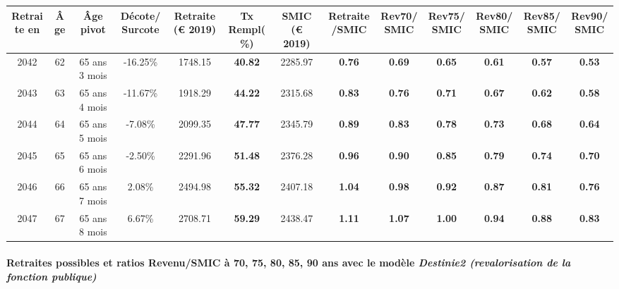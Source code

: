{ \scriptsize \begin{center} 
\begin{tabular}[htb]{|c|c||c|c||c|c||c||c|c|c|c|c|c|} 
\hline 
 Retraite en &  Âge &  Âge pivot &  Décote/Surcote &  Retraite (\euro{} 2019) &  Tx Rempl(\%) &  SMIC (\euro{} 2019) &  Retraite/SMIC &  Rev70/SMIC &  Rev75/SMIC &  Rev80/SMIC &  Rev85/SMIC &  Rev90/SMIC \\ 
\hline \hline 
 2042 &  62 &  65 ans 3 mois &  -16.25\% &  1748.15 &  {\bf 40.82} &  2285.97 &  {\bf {\color{red} 0.76}} &  {\bf {\color{red} 0.69}} &  {\bf {\color{red} 0.65}} &  {\bf {\color{red} 0.61}} &  {\bf {\color{red} 0.57}} &  {\bf {\color{red} 0.53}} \\ 
\hline 
 2043 &  63 &  65 ans 4 mois &  -11.67\% &  1918.29 &  {\bf 44.22} &  2315.68 &  {\bf {\color{red} 0.83}} &  {\bf {\color{red} 0.76}} &  {\bf {\color{red} 0.71}} &  {\bf {\color{red} 0.67}} &  {\bf {\color{red} 0.62}} &  {\bf {\color{red} 0.58}} \\ 
\hline 
 2044 &  64 &  65 ans 5 mois &  -7.08\% &  2099.35 &  {\bf 47.77} &  2345.79 &  {\bf {\color{red} 0.89}} &  {\bf {\color{red} 0.83}} &  {\bf {\color{red} 0.78}} &  {\bf {\color{red} 0.73}} &  {\bf {\color{red} 0.68}} &  {\bf {\color{red} 0.64}} \\ 
\hline 
 2045 &  65 &  65 ans 6 mois &  -2.50\% &  2291.96 &  {\bf 51.48} &  2376.28 &  {\bf {\color{red} 0.96}} &  {\bf {\color{red} 0.90}} &  {\bf {\color{red} 0.85}} &  {\bf {\color{red} 0.79}} &  {\bf {\color{red} 0.74}} &  {\bf {\color{red} 0.70}} \\ 
\hline 
 2046 &  66 &  65 ans 7 mois &  2.08\% &  2494.98 &  {\bf 55.32} &  2407.18 &  {\bf 1.04} &  {\bf {\color{red} 0.98}} &  {\bf {\color{red} 0.92}} &  {\bf {\color{red} 0.87}} &  {\bf {\color{red} 0.81}} &  {\bf {\color{red} 0.76}} \\ 
\hline 
 2047 &  67 &  65 ans 8 mois &  6.67\% &  2708.71 &  {\bf 59.29} &  2438.47 &  {\bf 1.11} &  {\bf 1.07} &  {\bf 1.00} &  {\bf {\color{red} 0.94}} &  {\bf {\color{red} 0.88}} &  {\bf {\color{red} 0.83}} \\ 
\hline 
\hline 
\end{tabular} 
\end{center} } 
\paragraph{Retraites possibles et ratios Revenu/SMIC à 70, 75, 80, 85, 90 ans avec le modèle \emph{Destinie2 (revalorisation de la fonction publique)}}  
 
